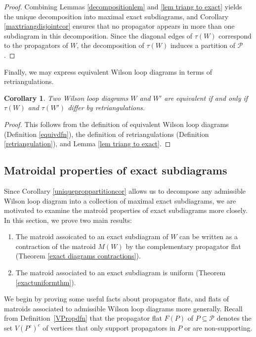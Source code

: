 \documentclass[11pt]{article}
\newcommand{\cP}{\mathcal{P}}
\newtheorem{cor}[thm]{Corollary}
\theoremstyle{remark}
\theoremstyle{definition}
\begin{document}
\begin{proof}
Combining Lemmas \ref{decompositionlem} and \ref{lem triang to exact} yields the unique decomposition into maximal exact subdiagrams, and Corollary \ref{maxtriangdisjointcor} ensures that no propagator appears in more than one subdiagram in this decomposition. Since the diagonal edges of $\tau(W)$ correspond to the propagators of $W$, the decomposition of $\tau(W)$ induces a partition of $\cP$.
\end{proof}

Finally, we may express equivalent Wilson loop diagrams in terms of retriangulations.

\begin{cor}\label{equialentretriangulation}
Two Wilson loop diagrams $W$ and $W'$ are equivalent if and only if $\tau(W)$ and $\tau(W')$ differ by retriangulations.
\end{cor}

\begin{proof}
This follows from the definition of equivalent Wilson loop diagrams (Definition \ref{equivdfn}), the definition of retriangulations (Definition \ref{retriangulation}), and Lemma \ref{lem triang to exact}.
\end{proof}



\subsection{Matroidal properties of exact subdiagrams \label{sec: exact diagram matroidal props}}

Since Corollary \ref{uniqueproppartitioncor} allows us to decompose any admissible Wilson loop diagram into a collection of maximal exact subdiagrams, we are motivated to examine the matroid properties of exact subdiagrams more closely. In this section, we prove two main results:
\begin{enumerate}
\item The matroid assoicated to an exact subdiagram of $W$ can be written as a contraction of the matroid $M(W)$ by the complementary propagator flat (Theorem \ref{exact diagrams contractions}). 
\item The matroid associated to an exact subdiagram is uniform (Theorem \ref{exactuniformthm}).
\end{enumerate}

We begin by proving some useful facts about propagator flats, and flats of matroids associated to admissible Wilson loop diagrams more generally. Recall from Definition~\ref{VPropdfn} that the propagator flat $F(P)$ of $P \subseteq \cP$ denotes the set $V(P^c)^c$ of vertices that only support propagators in $P$ or are non-supporting.
\end{document}

